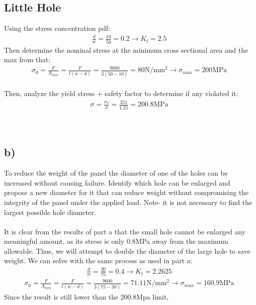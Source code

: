 \documentclass[12 pt]{article}
\begin{document}
\subsection*{Little Hole}
Using the stress concentration pdf:
\begin{align*}
    \frac{d}{w}=\frac{10}{50}=0.2 \rightarrow K_t=2.5
\end{align*}
Then determine the nominal stress at the minimum cross sectional area and the max from that:
\begin{align*}
    \sigma_0=\frac{F}{A_{min}}=\frac{F}{t(w-d)}=\frac{9600}{3(50-10)}=80\text{N/mm$^2$} \rightarrow
    \sigma_{max} = 200\text{MPa}
\end{align*}
\\ Then, analyze the yield stress + safety factor to determine if any violated it:
\begin{align*}
    \sigma=\frac{\sigma_Y}{n}=\frac{251}{1.25}=200.8\text{MPa}
\end{align*}
 \\
 \\

\subsection*{b)}
To reduce the weight of the panel the diameter of one of the holes can be increased without
causing failure. Identify which hole can be enlarged and propose a new diameter for it that
can reduce weight without compromising the integrity of the panel under the applied load.
Note- it is not necessary to find the largest possible hole diameter. \\ \\
It is clear from the results of part a that the small hole cannot be enlarged any meaningful amount, as its stress is
only 0.8MPa away from the maximum allowable. Thus, we will attempt to double the diameter of the large hole to save
weight. We can solve with the same process as used in part a:
\begin{align*}
    \frac{d}{w}=\frac{30}{75}=0.4 \rightarrow K_t=2.2625
\end{align*}
\begin{align*}
    \sigma_0=\frac{F}{A_{min}}=\frac{F}{t(w-d)}=\frac{9600}{3(75-30)}=71.11\text{N/mm$^2$} \rightarrow
    \sigma_{max} = 160.9\text{MPa}
\end{align*}
Since the result is still lower than the 200.8Mpa limit, 
\end{document}
